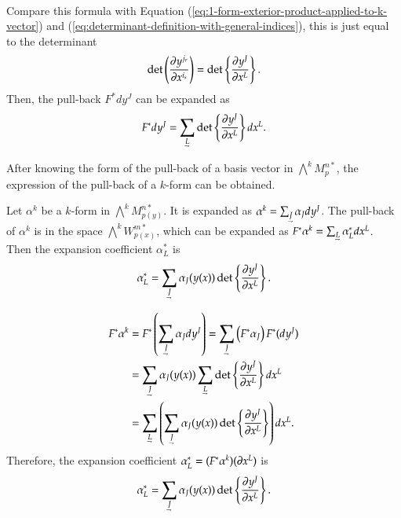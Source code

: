 \documentclass[11pt, a4paper]{book}
\begin{document}
\begin{Proof}
\begin{align*}
  \end{align*}
  Compare this formula with Equation
  (\ref{eq:1-form-exterior-product-applied-to-k-vector}) and
  (\ref{eq:determinant-definition-with-general-indices}), this is just equal to the
  determinant
  \begin{equation*}
    \det \left( \frac{\partial y^{j_r}}{\partial x^{i_s}} \right) = \det \left\{
      \frac{\partial y^J}{\partial x^L} \right\}.
  \end{equation*}
  Then, the pull-back $F^{*}dy^J$ can be expanded as
  \begin{equation*}
    F^{*}dy^J = \sum_{\underaccent{\rightharpoondown}{L}} \det \left\{
      \frac{\pdiff y^J}{\pdiff x^L} \right\} dx^L.
  \end{equation*}
\end{Proof}

After knowing the form of the pull-back of a basis vector in $\bigwedge^k M_p^{n*}$, the
expression of the pull-back of a $k$-form can be obtained.
\begin{Proposition}
  Let $\alpha^k$ be a $k$-form in $\bigwedge^k M_{p(y)}^{n*}$. It is expanded as
  $\alpha^k = \sum_{\underaccent{\rightharpoondown}{J}} \alpha_J dy^J$. The pull-back of
  $\alpha^k$ is in the space $\bigwedge^k W_{p(x)}^{m*}$, which can be expanded as
  $F^{*}\alpha^k = \sum_{\underaccent{\rightharpoondown}{L}} \alpha_L^{*} dx^L$. Then the
  expansion coefficient $\alpha_L^{*}$ is
  \begin{equation}
    \alpha_L^{*} = \sum_{\underaccent{\rightharpoondown}{J}} \alpha_J(y(x)) \det \left\{
      \frac{\pdiff y^{J}}{\pdiff x^L} \right\}.
  \end{equation}
\end{Proposition}

\begin{Proof}
  \begin{align*}
    F^{*}\alpha^k
    &= F^{*} \left( \sum_{\underaccent{\rightharpoondown}{J}} \alpha_J dy^J \right) =
      \sum_{\underaccent{\rightharpoondown}{J}} \left( F^{*}\alpha_J \right) F^{*}(dy^J)
    \\
    &= \sum_{\underaccent{\rightharpoondown}{J}} \alpha_J(y(x))
      \sum_{\underaccent{\rightharpoondown}{L}} \det \left\{ \frac{\pdiff y^J}{\pdiff x^L}
      \right\} dx^L \\
    &= \sum_{\underaccent{\rightharpoondown}{L}} \left(
      \sum_{\underaccent{\rightharpoondown}{J}} \alpha_J(y(x)) \det \left\{ \frac{\pdiff
      y^J}{\pdiff x^L} \right\} \right) dx^L.
  \end{align*}
  Therefore, the expansion coefficient $\alpha_L^{*} = (F^{*}\alpha^k)(\boldsymbol{\partial}x^L)$
  is
  \begin{equation*}
    \alpha_L^{*} = \sum_{\underaccent{\rightharpoondown}{J}} \alpha_J(y(x)) \det \left\{
      \frac{\pdiff y^{J}}{\pdiff x^L} \right\}.
  \end{equation*}
\end{Proof}
\end{document}
